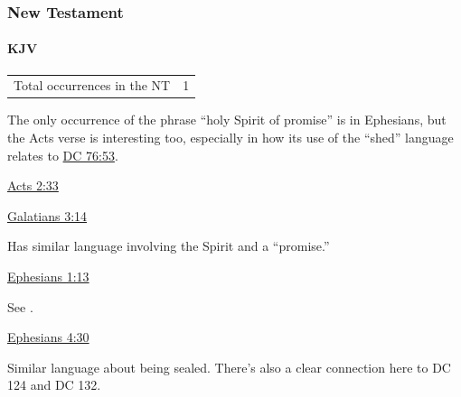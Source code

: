 		
		
	\subsubsection{New Testament} %
		\label{HSOP-NT}
	
		\paragraph{KJV}
			\label{HSOP-NT-KJV}		
	
			\begin{tabular}{ll}
				Total occurrences in the NT & 1
			\end{tabular}
			
				The only occurrence of the phrase ``holy Spirit of promise'' is in Ephesians, but the Acts verse is interesting too, especially in how its use of the ``shed'' language relates to \hyperref[DC76-53]{DC 76:53}.
			
			\begin{compactdesc}
				\item[{\hyperref[ACTS-2-33]{Acts 2:33}}]
				\item[{\hyperref[GALATIANS-3-14]{Galatians 3:14}}] \phantom{.}
					\begin{compactitem}
						\item Has similar language involving the Spirit and a ``promise.''
					\end{compactitem}
				\item[{\hyperref[EPHESIANS-1-13]{Ephesians 1:13}}] \phantom{.}
					\begin{compactitem}
						\item See \hyperref[SPHRAGIZO]{}.
					\end{compactitem}
				\item[{\hyperref[EPHESIANS-4-30]{Ephesians 4:30}}] \phantom{.}
					\begin{compactitem}
						\item Similar language about being sealed. There's also a clear connection here to DC 124 and DC 132.
					\end{compactitem}
			\end{compactdesc}
			
